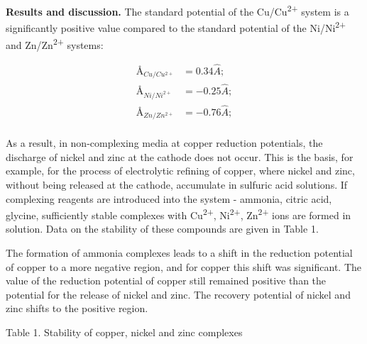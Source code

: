 {\bfseries Results and discussion.} The standard potential of the
Cu/Cu\textsuperscript{2+} system is a significantly positive value
compared to the standard potential of the Ni/Ni\textsuperscript{2+} and
Zn/Zn\textsuperscript{2+} systems:

\begin{align*}
\text{\AA}_{Cu/Cu^{2+}}&=0.34\hat{A}; \\
\text{\AA}_{Ni/Ni^{2+}}&=-0.25\hat{A}; \\
\text{\AA}_{Zn/Zn^{2+}}&=-0.76\hat{A}; \\
\end{align*}

As a result, in non-complexing media at copper reduction potentials, the
discharge of nickel and zinc at the cathode does not occur. This is the
basis, for example, for the process of electrolytic refining of copper,
where nickel and zinc, without being released at the cathode, accumulate
in sulfuric acid solutions. If complexing reagents are introduced into
the system - ammonia, citric acid, glycine, sufficiently stable
complexes with Cu\textsuperscript{2+}, Ni\textsuperscript{2+},
Zn\textsuperscript{2+} ions are formed in solution. Data on the
stability of these compounds are given in Table 1.

The formation of ammonia complexes leads to a shift in the reduction
potential of copper to a more negative region, and for copper this shift
was significant. The value of the reduction potential of copper still
remained positive than the potential for the release of nickel and zinc.
The recovery potential of nickel and zinc shifts to the positive region.

Table 1. Stability of copper, nickel and zinc complexes

